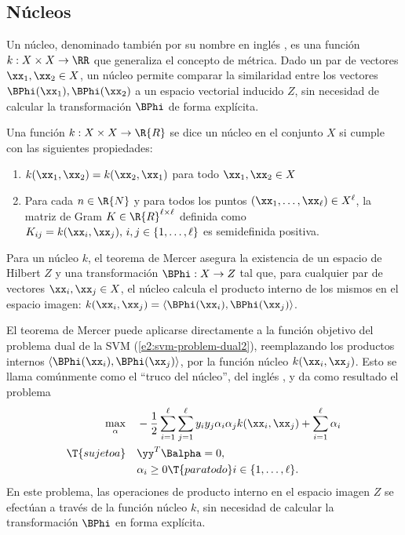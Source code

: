 %
%
\subsection{Núcleos}
%
Un núcleo, denominado también por su nombre en inglés , es
una función $k:X\times{}X\rightarrow{}\RR$ \cite{stewart} que
generaliza el concepto de métrica.  Dado un par de vectores
$\xx_1,\xx_2\in{}X$, un núcleo permite comparar la similaridad entre
los vectores $\BPhi(\xx_1),\BPhi(\xx_2)$  a un
espacio vectorial inducido $Z$, sin necesidad de calcular la
transformación $\BPhi$ de forma explícita.
%
\begin{definicion}[Núcleo]
  Una función $k:X\times{}X\rightarrow{}\R{R}$ se dice un núcleo
  en el conjunto $X$ si cumple con las siguientes propiedades:
  \begin{enumerate}
  \item $k(\xx_1,\xx_2)=k(\xx_2,\xx_1)$ para todo $\xx_1,\xx_2\in{}X$
  \item Para cada $n\in\R{N}$ y para todos los puntos
    $(\xx_1,\ldots,\xx_\ell)\in{}X^\ell$, la matriz de Gram
    $K\in\R{R}^{\ell\times\ell}$ definida como
    $K_{ij}=k(\xx_i,\xx_j),\,i,j\in\{1,\ldots,\ell\}$ es semidefinida
    positiva.
  \end{enumerate}
\end{definicion}
%
Para un núcleo $k$, el teorema de Mercer \cite{mercer} asegura la
existencia de un espacio de Hilbert $Z$ y una transformación
$\BPhi:X\rightarrow{}Z$ tal que, para cualquier par de vectores
$\xx_i,\xx_j\in{}X$, el núcleo calcula el producto interno de los
mismos en el espacio imagen:
$k(\xx_i,\xx_j)=\langle\BPhi(\xx_i),\BPhi(\xx_j)\rangle$.

El teorema de Mercer puede aplicarse directamente a la función
objetivo del problema dual de la SVM (\ref{e2:svm-problem-dual2}),
reemplazando los productos internos
$\left\langle\BPhi(\xx_i),\BPhi(\xx_j)\right\rangle$, por la función
núcleo $k(\xx_i,\xx_j)$. Esto se llama comúnmente como el ``truco del
núcleo'', del inglés , y da como resultado el problema
%
\begin{align}
  \begin{split}
    \max_\alpha &\quad
    -\frac{1}{2}\sum_{i=1}^\ell\sum_{j=1}^\ell y_iy_j\alpha_i\alpha_j
    k(\xx_i,\xx_j) + \sum_{i=1}^{\ell} \alpha_i \\
    \T{sujeto a} &\quad \yy^T\Balpha = 0, \\
    &\quad \alpha_i \geq 0\T{ para todo } i\in\{1,\ldots,\ell\}.
  \end{split}
  \label{e2:svm-problem-kernel}
\end{align}
%
En este problema, las operaciones de producto interno en el espacio
imagen $Z$ se efectúan a través de la función núcleo $k$, sin
necesidad de calcular la transformación $\BPhi$ en forma explícita.

